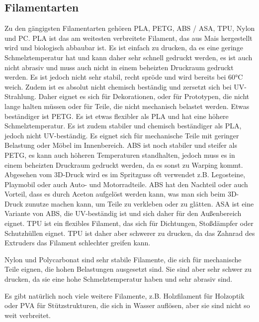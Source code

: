 \documentclass[10pt]{article}
\begin{document}
    \newpage
    \subsection{Filamentarten}
    Zu den gängigsten Filamentarten gehören PLA, PETG, ABS / ASA, TPU, Nylon und PC.
    PLA ist das am weitesten verbreitete Filament, das aus Mais hergestellt wird und biologisch abbaubar ist.
    Es ist einfach zu drucken, da es eine geringe Schmelztemperatur hat und kann daher sehr schnell gedruckt werden, es ist auch nicht abrasiv und muss auch nicht in einem beheizten Druckraum gedruckt werden.
    Es ist jedoch nicht sehr stabil, recht spröde und wird bereits bei 60°C weich.
    Zudem ist es absolut nicht chemisch beständig und zersetzt sich bei UV-Strahlung.
    Daher eignet es sich für Dekorationen, oder für Prototypen, die nicht lange halten müssen oder für Teile, die nicht mechanisch belastet werden.
    Etwas beständiger ist PETG. Es ist etwas flexibler als PLA und hat eine höhere Schmelztemperatur.
    Es ist zudem stabiler und chemisch beständiger als PLA, jedoch nicht UV-beständig.
    Es eignet sich für mechanische Teile mit geringer Belastung oder Möbel im Innenbereich.
    ABS ist noch stabiler und steifer als PETG, es kann auch höheren Temperaturen standhalten, jedoch muss es in einem beheizten Druckraum gedruckt werden, da es sonst zu Warping kommt.
    Abgesehen vom 3D-Druck wird es im Spritzguss oft verwendet z.B. Legosteine, Playmobil oder auch Auto- und Motorradteile.
    ABS hat den Nachteil oder auch Vorteil, dass es durch Aceton aufgelöst werden kann, was man sich beim 3D-Druck zunutze machen kann, um Teile zu verkleben oder zu glätten.
    ASA ist eine Variante von ABS, die UV-beständig ist und sich daher für den Außenbereich eignet.
    TPU ist ein flexibles Filament, das sich für Dichtungen, Stoßdämpfer oder Schutzhüllen eignet.
    TPU ist daher aber schwerer zu drucken, da das Zahnrad des Extruders das Filament schlechter greifen kann.

    Nylon und Polycarbonat sind sehr stabile Filamente, die sich für mechanische Teile eignen, die hohen Belastungen ausgesetzt sind.
    Sie sind aber sehr schwer zu drucken, da sie eine hohe Schmelztemperatur haben und sehr abrasiv sind.

    Es gibt natürlich noch viele weitere Filamente, z.B. Holzfilament für Holzoptik oder PVA für Stützstrukturen, die sich in Wasser auflösen, aber sie sind nicht so weit verbreitet. \\
\end{document}
